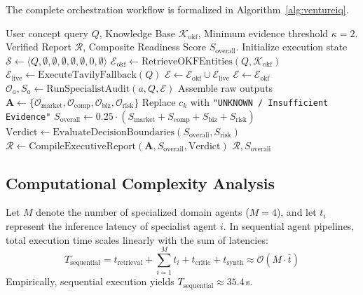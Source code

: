 \documentclass[conference]{IEEEtran}
\begin{document}
The complete orchestration workflow is formalized in Algorithm~\ref{alg:ventureiq}.

\begin{algorithm}[htbp]
\caption{VentureIQ Orchestration \& Verification Pipeline}
\label{alg:ventureiq}
\begin{algorithmic}[1]
\REQUIRE User concept query $Q$, Knowledge Base $\mathcal{K}_{\text{okf}}$, Minimum evidence threshold $\kappa = 2$.
\ENSURE Verified Report $\mathcal{R}$, Composite Readiness Score $S_{\text{overall}}$.
\STATE Initialize execution state $\mathcal{S} \leftarrow \langle Q, \emptyset, \emptyset, \emptyset, \emptyset, \emptyset, 0, \emptyset \rangle$
\STATE $\mathcal{E}_{\text{okf}} \leftarrow \text{RetrieveOKFEntities}(Q, \mathcal{K}_{\text{okf}})$
    \STATE $\mathcal{E}_{\text{live}} \leftarrow \text{ExecuteTavilyFallback}(Q)$
    \STATE $\mathcal{E} \leftarrow \mathcal{E}_{\text{okf}} \cup \mathcal{E}_{\text{live}}$
\ELSE
    \STATE $\mathcal{E} \leftarrow \mathcal{E}_{\text{okf}}$
\ENDIF
\STATE {}
    \STATE $\mathcal{O}_a, S_a \leftarrow \text{RunSpecialistAudit}(a, Q, \mathcal{E})$
\ENDPARALLELFOR
\STATE Assemble raw outputs $\mathbf{A} \leftarrow \{\mathcal{O}_{\text{market}}, \mathcal{O}_{\text{comp}}, \mathcal{O}_{\text{biz}}, \mathcal{O}_{\text{risk}}\}$
\STATE {}
        \STATE Replace $c_k$ with \texttt{"UNKNOWN / Insufficient Evidence"}
    \ENDIF
\ENDFOR
\STATE $S_{\text{overall}} \leftarrow 0.25 \cdot (S_{\text{market}} + S_{\text{comp}} + S_{\text{biz}} + S_{\text{risk}})$
\STATE $\text{Verdict} \leftarrow \text{EvaluateDecisionBoundaries}(S_{\text{overall}}, S_{\text{risk}})$
\STATE $\mathcal{R} \leftarrow \text{CompileExecutiveReport}(\mathbf{A}, S_{\text{overall}}, \text{Verdict})$
\RETURN $\mathcal{R}, S_{\text{overall}}$
\end{algorithmic}
\end{algorithm}

\subsection{Computational Complexity Analysis}
Let $M$ denote the number of specialized domain agents ($M = 4$), and let $t_i$ represent the inference latency of specialist agent $i$. 
In sequential agent pipelines, total execution time scales linearly with the sum of latencies:
\begin{equation}
T_{\text{sequential}} = t_{\text{retrieval}} + \sum_{i=1}^{M} t_i + t_{\text{critic}} + t_{\text{synth}} \approx \mathcal{O}(M \cdot \bar{t})
\end{equation}
Empirically, sequential execution yields $T_{\text{sequential}} \approx 35.4$\,s. 
\end{document}
